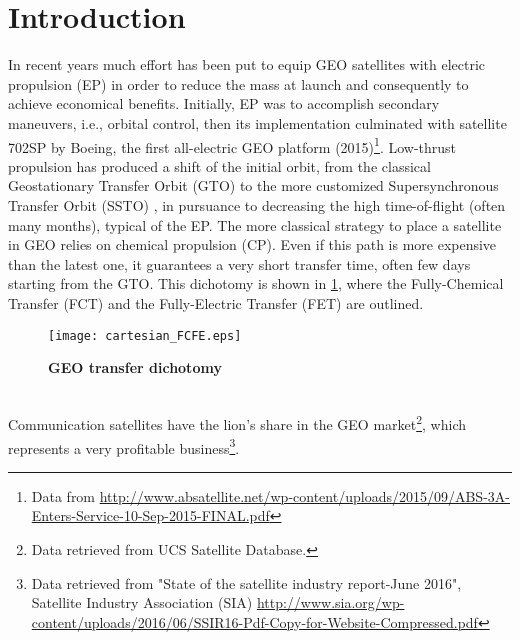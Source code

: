 
\section{Introduction}
In recent years much effort has been put to equip GEO satellites with electric propulsion (EP) in order to reduce the mass at launch \cite{goebel2002performance} and consequently to achieve economical benefits. 
Initially, EP was to accomplish
secondary maneuvers, i.e., orbital control, then its implementation culminated with satellite 702SP by Boeing, the first all-electric GEO platform (2015)\footnote{Data from \url{http://www.absatellite.net/wp-content/uploads/2015/09/ABS-3A-Enters-Service-10-Sep-2015-FINAL.pdf}}. 
%
%
%
%
Low-thrust propulsion has produced a shift of the initial orbit, from the classical Geostationary Transfer Orbit (GTO) to the more customized Supersynchronous Transfer Orbit (SSTO) \cite{pooleboeing}, in pursuance to decreasing the high time-of-flight (often many months), typical of the EP.
The more classical strategy to place a satellite in GEO relies on chemical propulsion (CP)\cite{wertz2011space}. Even if this path is more expensive than the latest one, it guarantees a very short transfer time, often few days starting from the GTO.
This dichotomy is shown in \figurename\ref{fig:dichotomy}, where the Fully-Chemical Transfer (FCT) and the Fully-Electric Transfer (FET) are outlined.
\begin{figure}[htp]
\centering
\texttt{[image: cartesian\_FCFE.eps]}
\caption{\textbf{GEO transfer dichotomy}}
\label{fig:dichotomy}
\end{figure}
\\
Communication satellites have the lion's share in the GEO market\footnote{Data retrieved from UCS Satellite Database.}, which represents a very profitable business\footnote{Data retrieved from "State of the satellite industry report-June 2016", Satellite Industry Association (SIA) \url{http://www.sia.org/wp-content/uploads/2016/06/SSIR16-Pdf-Copy-for-Website-Compressed.pdf}}.
